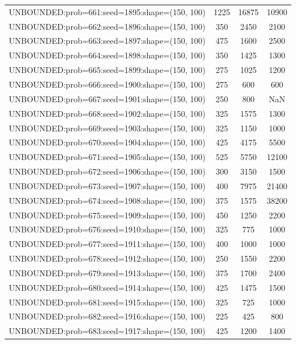 \begin{longtable}{lccc}
UNBOUNDED:prob=661:seed=1895:shape=(150, 100) &     1225 & 16875 &  10900 \\
UNBOUNDED:prob=662:seed=1896:shape=(150, 100) &      350 &  2450 &   2100 \\
UNBOUNDED:prob=663:seed=1897:shape=(150, 100) &      475 &  1600 &   2500 \\
UNBOUNDED:prob=664:seed=1898:shape=(150, 100) &      350 &  1425 &   1300 \\
UNBOUNDED:prob=665:seed=1899:shape=(150, 100) &      275 &  1025 &   1200 \\
UNBOUNDED:prob=666:seed=1900:shape=(150, 100) &      275 &   600 &    600 \\
UNBOUNDED:prob=667:seed=1901:shape=(150, 100) &      250 &   800 &    NaN \\
UNBOUNDED:prob=668:seed=1902:shape=(150, 100) &      325 &  1575 &   1300 \\
UNBOUNDED:prob=669:seed=1903:shape=(150, 100) &      325 &  1150 &   1000 \\
UNBOUNDED:prob=670:seed=1904:shape=(150, 100) &      425 &  4175 &   5500 \\
UNBOUNDED:prob=671:seed=1905:shape=(150, 100) &      525 &  5750 &  12100 \\
UNBOUNDED:prob=672:seed=1906:shape=(150, 100) &      300 &  3150 &   1500 \\
UNBOUNDED:prob=673:seed=1907:shape=(150, 100) &      400 &  7975 &  21400 \\
UNBOUNDED:prob=674:seed=1908:shape=(150, 100) &      375 &  1575 &  38200 \\
UNBOUNDED:prob=675:seed=1909:shape=(150, 100) &      450 &  1250 &   2200 \\
UNBOUNDED:prob=676:seed=1910:shape=(150, 100) &      325 &   775 &   1000 \\
UNBOUNDED:prob=677:seed=1911:shape=(150, 100) &      400 &  1000 &   1000 \\
UNBOUNDED:prob=678:seed=1912:shape=(150, 100) &      250 &  1550 &   2200 \\
UNBOUNDED:prob=679:seed=1913:shape=(150, 100) &      375 &  1700 &   2400 \\
UNBOUNDED:prob=680:seed=1914:shape=(150, 100) &      425 &  1475 &   1500 \\
UNBOUNDED:prob=681:seed=1915:shape=(150, 100) &      325 &   725 &   1000 \\
UNBOUNDED:prob=682:seed=1916:shape=(150, 100) &      225 &   425 &    800 \\
UNBOUNDED:prob=683:seed=1917:shape=(150, 100) &      425 &  1200 &   1400 \\

\end{longtable}

